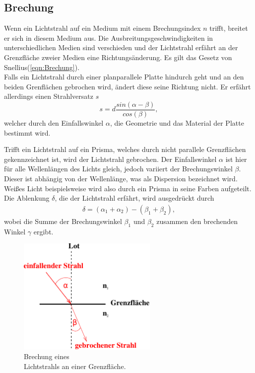 \subsection{Brechung}
\label{subsec:Brechung}
\begin{minipage}[t]{0,5\textwidth}
    Wenn ein Lichtstrahl auf ein Medium mit einem Brechungsindex $n$ trifft, breitet er sich in diesem Medium aus. 
    Die Ausbreitungsgeschwindigkeiten in unterschiedlichen Medien sind verschieden und der Lichtstrahl erfährt an der Grenzfläche zweier Medien eine Richtungsänderung.
    Es gilt das Gesetz von Snellius(\ref{eqn:Brechung}).\\
    Falls ein Lichtstrahl durch einer planparallele Platte hindurch geht und an den beiden Grenflächen gebrochen wird, ändert diese seine Richtung nicht.
    Er erfährt allerdings einen Strahlversatz $s$
    \begin{equation}
        s = d\frac{sin(\alpha-\beta)}{cos(\beta)},
        \label{eqn:Strahlversatz}
    \end{equation}
    welcher durch den Einfallswinkel $\alpha$, die Geometrie und das Material der Platte bestimmt wird.

    Trifft ein Lichtstrahl auf ein Prisma, welches durch nicht parallele Grenzflächen gekennzeichnet ist, wird der Lichtstrahl gebrochen.
    Der Einfallswinkel $\alpha$ ist hier für alle Wellenlängen des Lichts gleich, jedoch variiert der Brechungswinkel $\beta$. Dieser
    ist abhängig von der Wellenlänge, was als Dispersion bezeichnet wird. Weißes Licht beispielsweise wird also durch ein Prisma in seine Farben aufgeteilt.
    Die Ablenkung $\delta$, die der Lichtstrahl erfährt, wird ausgedrückt durch
    \begin{align}
        \delta = (\alpha_1 + \alpha_2)- (\beta_1 + \beta_2),
        \label{eqn:Ablenkung}
    \end{align}
    wobei die Summe der Brechungswinkel $\beta_1$ und $\beta_2$ zusammen den brechenden Winkel $\gamma$ ergibt.
\end{minipage}
\begin{minipage}[t]{0,5\textwidth}
    \begin{figure}[H]
        \centering
        \includegraphics[width=0.6\textwidth]{build/Abb_2b.pdf}
        \caption {Brechung eines \\Lichtstrahls an einer Grenzfläche\cite[2]{V400}.}
        \label{fig:Abb_1}
    \end{figure}

\end{minipage}
